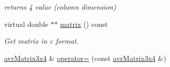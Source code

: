\begin{DoxyCompactItemize}
\begin{DoxyCompactList}\small\item\em returns 4 value (column dimension) \end{DoxyCompactList}\item 
virtual double $\ast$$\ast$ \hyperlink{classavr_matrix3x4_ab51a103b8c059a18324d4c675a47a0fa}{matrix} () const 
\begin{DoxyCompactList}\small\item\em Get matrix in c format. \end{DoxyCompactList}\item 
\hypertarget{classavr_matrix3x4_a1df7a480b6c33d08d2151f513bc7541b}{\hyperlink{classavr_matrix3x4}{avr\-Matrix3x4} \& \hyperlink{classavr_matrix3x4_a1df7a480b6c33d08d2151f513bc7541b}{operator=} (const \hyperlink{classavr_matrix3x4}{avr\-Matrix3x4} \&)}\label{classavr_matrix3x4_a1df7a480b6c33d08d2151f513bc7541b}


\end{DoxyCompactItemize}
